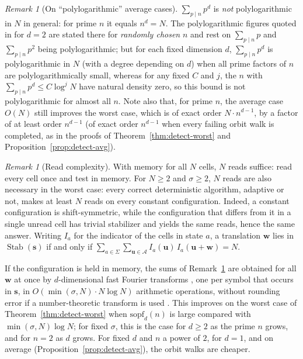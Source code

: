 \documentclass[11pt,a4paper]{article}
\theoremstyle{remark}
\newtheorem{remark}[theorem]{Remark}
\DeclareMathOperator{\Stab}{Stab}
\newcommand{\A}{\mathcal{A}}
\newcommand{\uu}{\mathbf{u}}
\newcommand{\ww}{\mathbf{w}}
\newcommand{\ssb}{\mathbf{s}}
\begin{document}
\begin{remark}[On ``polylogarithmic'' average cases]\label{rem:polylog}
$\sum_{p\mid n}p^d$ is \emph{not} polylogarithmic in $N$ in general: for
prime $n$ it equals $n^d=N$. The polylogarithmic figures quoted in
\cite[Sec.~V--VI]{banda2019} for $d=2$ are stated there for
\emph{randomly chosen} $n$ and rest on $\sum_{p\mid n}p$ and
$\sum_{p\mid n}p^2$ being polylogarithmic; but for each fixed dimension $d$,
$\sum_{p\mid n}p^d$ is polylogarithmic in $N$ (with a degree depending on
$d$) when all prime factors of $n$ are polylogarithmically small, whereas for any fixed $C$ and $j$, the $n$
with $\sum_{p\mid n}p^d\le C\log^j N$ have natural density zero, so this
bound is not polylogarithmic for almost all $n$. Note also that, for prime $n$, the average case
$O(N)$ still improves the worst case, which is of exact order
$N\cdot n^{d-1}$, by a factor of at least order $n^{d-1}$ (of exact order
$n^{d-1}$ when every failing orbit walk is completed, as in the proofs of
Theorem~\ref{thm:detect-worst} and Proposition~\ref{prop:detect-avg}).
\end{remark}

\begin{remark}[Read complexity]\label{rem:reads}
With memory for all $N$ cells, $N$ reads suffice: read every cell once and
test in memory. For $N\ge2$ and $\sigma\ge2$, $N$ reads are also necessary
in the worst case: every correct deterministic algorithm, adaptive or not, makes at least $N$
reads on every constant configuration. Indeed, a constant
configuration is shift-symmetric, while the configuration that differs from
it in a single unread cell has trivial stabilizer and yields the same reads,
hence the same answer. Writing $I_a$ for the indicator of the cells in
state $a$, a translation $\ww$ lies in $\Stab(\ssb)$ if and only if
$\sum_{a\in\Sigma}\sum_{\uu\in\A}I_a(\uu)\,I_a(\uu+\ww)=N$.
\end{remark}

If the configuration is held in memory, the sums of Remark~\ref{rem:reads} are obtained for all $\ww$ at once by $d$-dimensional
fast Fourier transforms \cite{cooleytukey1965,bluestein1970}, one per symbol
that occurs in $\ssb$, in $O(\min(\sigma,N)\cdot N\log N)$ arithmetic
operations, without rounding error if a number-theoretic transform is used
\cite{pollard1971}. This improves on the worst case of
Theorem~\ref{thm:detect-worst} when $\mathrm{sopf}_d(n)$ is large compared
with $\min(\sigma,N)\log N$; for fixed $\sigma$, this is the case for
$d\ge2$ as the prime $n$ grows, and for $n=2$ as $d$ grows. For fixed $d$
and $n$ a power of $2$, for $d=1$, and on average
(Proposition~\ref{prop:detect-avg}), the orbit walks are cheaper.
\end{document}
